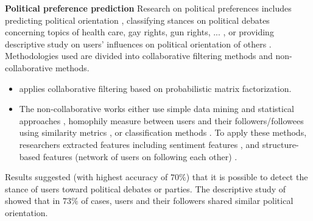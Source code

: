 \documentclass[11pt,a4paper]{article}
\begin{document}
\textbf{Political preference prediction}
Research on political preferences includes predicting political orientation \cite{golbeck, gottipati}, classifying stances on political debates concerning topics of health care, gay rights, gun rights, ... \cite{somasundaran, walker}, or providing descriptive study on users' influences on political orientation of others \cite{zafarani} . Methodologies used are divided into collaborative filtering methods and non-collaborative methods.  
\begin{itemize}
\item \citet{gottipati} applies collaborative filtering based on probabilistic matrix factorization.
\item The non-collaborative works either use simple data mining and statistical approaches \cite{golbeck}, homophily measure between users and their followers/followees using similarity metrics \cite{zafarani}, or classification methods \cite{somasundaran, walker}. To apply these methods, researchers extracted features including sentiment features \cite{somasundaran, walker}, and structure-based features (network of users on following each other) \cite{golbeck, zafarani}. 
\end{itemize}
Results suggested (with highest accuracy of $70\%$) that it is possible to detect the stance of users toward political debates or parties. The descriptive study of \cite{zafarani} showed that in $73\%$ of cases, users and their followers shared similar political orientation.

\end{document}
